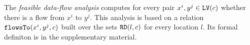 The {\em feasible data-flow analysis} computes for every pair $x^i, y^j \in \mathtt{LV}(c)$
 whether there is a flow from $x^i$ to $y^j$. 
 This analysis is based on a relation $\mathtt{flowsTo}(x^i, y^j, c)$ built over the sets $\mathtt{RD}(l, c)$ for every location $l$. Its formal definiton is in the supplementary material.  
